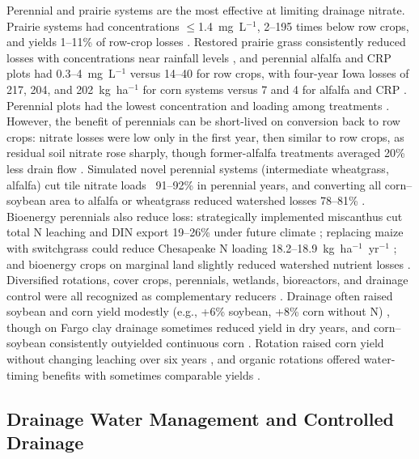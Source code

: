 \documentclass[11pt]{article}
\begin{document}
Perennial and prairie systems are the most effective at limiting drainage nitrate. Prairie systems had concentrations $\le$1.4~mg~L$^{-1}$, 2--195 times below row crops, and yields 1--11\% of row-crop losses \parencite{Daigh2015b}. Restored prairie grass consistently reduced losses with concentrations near rainfall levels \parencite{HernandezRamirez2011}, and perennial alfalfa and CRP plots had 0.3--4~mg~L$^{-1}$ versus 14--40 for row crops, with four-year Iowa losses of 217, 204, and 202~kg~ha$^{-1}$ for corn systems versus 7 and 4 for alfalfa and CRP \parencite{Randall2001}. Perennial plots had the lowest concentration and loading among treatments \parencite{Waring2024}. However, the benefit of perennials can be short-lived on conversion back to row crops: nitrate losses were low only in the first year, then similar to row crops, as residual soil nitrate rose sharply, though former-alfalfa treatments averaged 20\% less drain flow \parencite{Huggins2001}. Simulated novel perennial systems (intermediate wheatgrass, alfalfa) cut tile nitrate loads ~91--92\% in perennial years, and converting all corn--soybean area to alfalfa or wheatgrass reduced watershed losses 78--81\% \parencite{Wilson2023}. Bioenergy perennials also reduce loss: strategically implemented miscanthus cut total N leaching and DIN export 19--26\% under future climate \parencite{Ferin2023}; replacing maize with switchgrass could reduce Chesapeake N loading 18.2--18.9~kg~ha$^{-1}$~yr$^{-1}$ \parencite{Woodbury2018}; and bioenergy crops on marginal land slightly reduced watershed nutrient losses \parencite{Guo2018}. Diversified rotations, cover crops, perennials, wetlands, bioreactors, and drainage control were all recognized as complementary reducers \parencite{Dinnes2002}. Drainage often raised soybean and corn yield modestly (e.g., +6\% soybean, +8\% corn without N) \parencite{Cassman2025}, though on Fargo clay drainage sometimes reduced yield in dry years, and corn--soybean consistently outyielded continuous corn \parencite{Acharya2019b}. Rotation raised corn yield without changing leaching over six years \parencite{Bakhsh2005}, and organic rotations offered water-timing benefits with sometimes comparable yields \parencite{Logsdon2021}.

\subsection{Drainage Water Management and Controlled Drainage}
\end{document}
